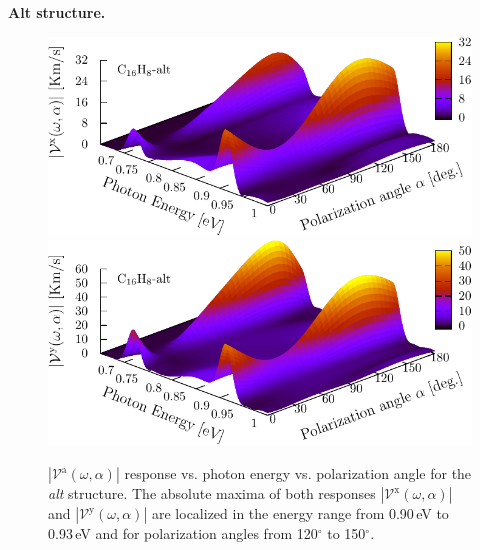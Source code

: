 \documentclass[prb,11pt,tightenlines,twocolumn,aps]{revtex4-1}
\begin{document}
\textbf{Alt structure.}
\begin{figure}[tb]
    \centering
    \includegraphics[width=\linewidth]{altplots/alt-3d-vxb}
    \label{fig:alt-3d-vvx}
    \\
    \includegraphics[width=\linewidth]{altplots/alt-3d-vyb}
    \label{fig:alt-3d-vvy}
    
    \caption{$|\mathcal{V}^{\mathrm{a}}(\omega,\alpha)|$ response vs. photon
    energy vs. polarization angle for the \emph{alt} structure. The absolute
    maxima of both responses $|\mathcal{V}^{\mathrm{x}}(\omega,\alpha)|$ and
    $|\mathcal{V}^{\mathrm{y}}(\omega,\alpha)|$ are localized in the energy
    range from 0.90\,eV to 0.93\,eV and for polarization angles from
    120$^{\circ}$ to 150$^{\circ}$.}
    \label{fig:alt-3d-vva}
\end{figure}
\end{document}
